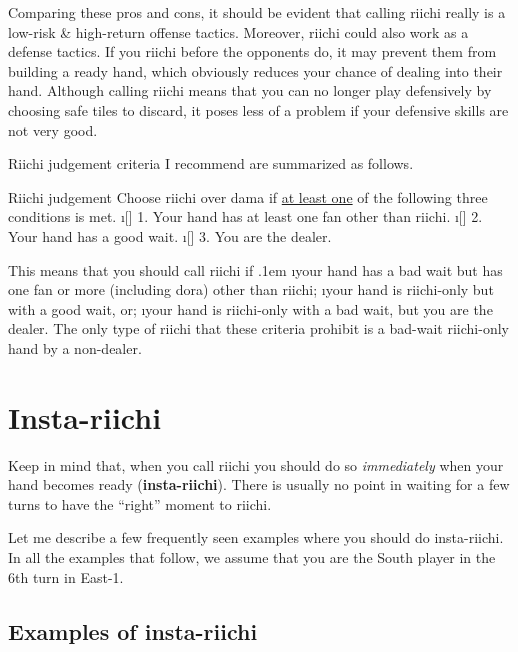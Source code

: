 \bigskip
\noindent
Comparing these pros and cons, it should be evident that calling {\jap riichi} really is a low-risk \& high-return offense tactics. Moreover, {\jap riichi} could also work as a defense tactics. If you {\jap riichi} before the opponents do, it may prevent them from building a ready hand, which obviously reduces your chance of dealing into their hand. 
Although calling {\jap riichi} means that you can no longer play defensively by choosing safe tiles to discard, it poses less of a problem if your defensive skills are not very good. 

\bigskip

{\jap Riichi} judgement criteria I recommend are summarized as follows. 

\bigskip
\begin{itembox}[c]{{\jap Riichi} judgement}
Choose {\jap riichi} over {\jap dama} if \underline{\large at least one} of the following three conditions is met. 
\bi
\i[] 1. Your hand has at least one {\jap fan} other than {\jap riichi}.
\i[] 2. Your hand has a good wait.
\i[] 3. You are the dealer.
\ei \vsps
\end{itembox}

\newpage
\noindent This means that you should call {\jap riichi} if 
\bi \itemsep.1em
\i your hand has a bad wait but has one {\jap fan} or more (including {\jap dora}) other than {\jap riichi};
\i your hand is {\jap riichi}-only but with a good wait, or;
\i your hand is {\jap riichi}-only with a bad wait, but you are the dealer. 
\ei
The only type of {\jap riichi} that these criteria prohibit is a bad-wait {\jap riichi}-only hand by a non-dealer. 


\section{Insta-{\jap riichi}} 	
Keep in mind that, when you call {\jap riichi} you should do so \emph{immediately} when your hand becomes ready ({\bf insta-{\jap riichi}}). There is usually no point in waiting for a few turns to have the ``right'' moment to {\jap riichi}. 

\bigskip
Let me describe a few frequently seen examples where you should do insta-{\jap riichi}. 
In all the examples that follow, we assume that you are the South player in the 6th turn in East-1. 

\subsection{Examples of insta-{\jap riichi}}

